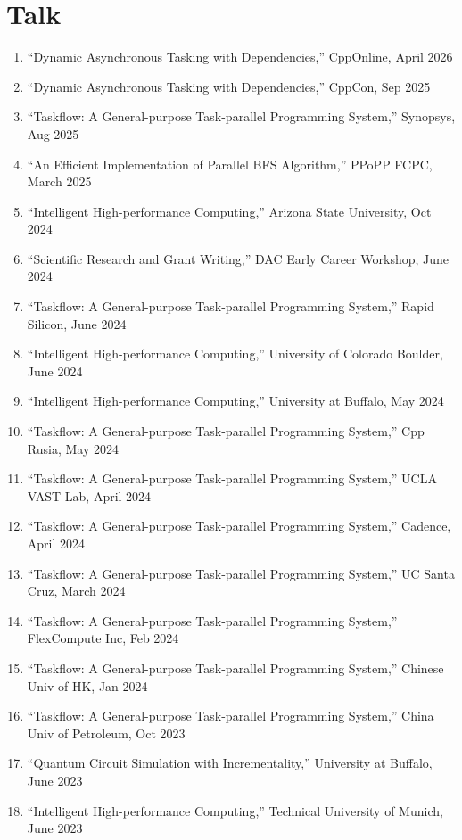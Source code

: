 \documentclass[A4,11pt]{article}
\begin{document}
\section{Talk}
 \begin{enumerate}
 \itemsep-0.3em
  \item ``Dynamic Asynchronous Tasking with Dependencies,'' CppOnline, April 2026
  \item ``Dynamic Asynchronous Tasking with Dependencies,'' CppCon, Sep 2025
  \item ``Taskflow: A General-purpose Task-parallel Programming System,'' Synopsys, Aug 2025
  \item ``An Efficient Implementation of Parallel BFS Algorithm,'' PPoPP FCPC, March 2025
  \item ``Intelligent High-performance Computing,'' Arizona State University, Oct 2024
  \item ``Scientific Research and Grant Writing,'' DAC Early Career Workshop, June 2024
  \item ``Taskflow: A General-purpose Task-parallel Programming System,'' Rapid Silicon, June 2024
  \item ``Intelligent High-performance Computing,'' University of Colorado Boulder, June 2024
  \item ``Intelligent High-performance Computing,'' University at Buffalo, May 2024
  \item ``Taskflow: A General-purpose Task-parallel Programming System,'' Cpp Rusia, May 2024
  \item ``Taskflow: A General-purpose Task-parallel Programming System,'' UCLA VAST Lab, April 2024
  \item ``Taskflow: A General-purpose Task-parallel Programming System,'' Cadence, April 2024
  \item ``Taskflow: A General-purpose Task-parallel Programming System,'' UC Santa Cruz, March 2024 
  \item ``Taskflow: A General-purpose Task-parallel Programming System,'' FlexCompute Inc, Feb 2024
  \item ``Taskflow: A General-purpose Task-parallel Programming System,'' Chinese Univ of HK, Jan 2024
  \item ``Taskflow: A General-purpose Task-parallel Programming System,'' China Univ of Petroleum, Oct 2023
  \item ``Quantum Circuit Simulation with Incrementality,'' University at Buffalo, June 2023
  \item ``Intelligent High-performance Computing,'' Technical University of Munich, June 2023

\end{enumerate}
\end{document}

